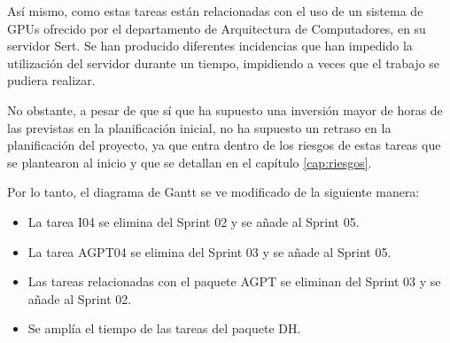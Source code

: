 Así mismo, como estas tareas están relacionadas con el uso de un sistema de GPUs
ofrecido por el departamento de Arquitectura de Computadores, en su servidor Sert.
Se han producido diferentes incidencias que han impedido la utilización del servidor durante
un tiempo, impidiendo a veces que el trabajo se pudiera realizar.

No obstante, a pesar de que sí que ha supuesto una inversión mayor de horas de las
previstas en la planificación inicial, no ha supuesto un retraso en la planificación
del proyecto, ya que entra dentro de los riesgos de estas tareas que se plantearon
al inicio y que se detallan en el capítulo \ref{cap:riesgos}.

Por lo tanto, el diagrama de Gantt se ve modificado de la siguiente manera:

\begin{itemize}
    \item La tarea I04 se elimina del Sprint 02 y se añade al Sprint 05.
    \item La tarea AGPT04 se elimina del Sprint 03 y se añade al Sprint 05.
    \item Las tareas relacionadas con el paquete AGPT se eliminan del Sprint 03 y se añade al Sprint 02.
    \item Se amplía el tiempo de las tareas del paquete DH.
\end{itemize}